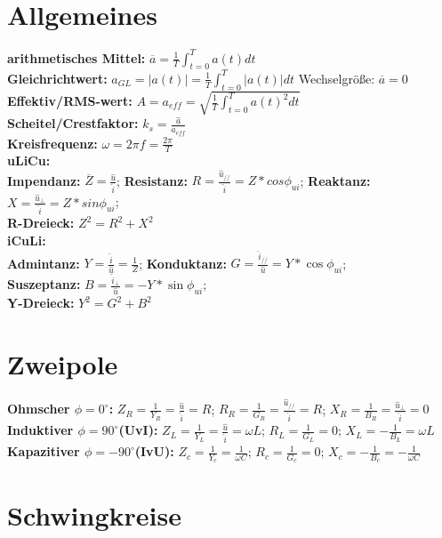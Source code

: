 \documentclass[10pt,a5paper]{article}
\author{Christian Böhm}
\begin{document}
\section{Allgemeines}
\textbf{arithmetisches Mittel:} $\overline{a}=\frac{1}{T}\int_{t=0}^{T}a(t)dt$
\\\textbf{Gleichrichtwert:} $a_{GL}=|a(t)|=\frac{1}{T}\int_{t=0}^{T}|a(t)|dt$ Wechselgröße: $\overline{a}=0$\\
\textbf{Effektiv/RMS-wert:} $A=a_{eff}=\sqrt{\frac{1}{T}\int_{t=0}^{T}a(t)^2dt} $  
\\\textbf{Scheitel/Crestfaktor:} $k_s=\frac{\hat{a}}{a_{eff}}$ 
  \\\textbf{Kreisfrequenz:} $\omega=2\pi f=\frac{2\pi}{T}$
 \\\textbf{uLiCu:}
 \\\textbf{Impendanz:} $\overline{Z}=\frac{\hat{u}}{\hat{i}}$; \textbf{Resistanz:} $R=\frac{\hat{u}_{//}}{\hat{i}}=Z*cos\phi_{ui}$; \textbf{Reaktanz:} $X=\frac{\hat{u}_\bot}{\hat{i}}=Z*sin\phi_{ui}$; \\\textbf{R-Dreieck:} $Z^2=R^2+X^2$ 
 \\ \textbf{iCuLi:}
 \\ \textbf{Admintanz:} $Y=\frac{\hat{i}}{\hat{u}}=\frac{1}{Z}$; \textbf{Konduktanz:} $G=\frac{\hat{i}_{//}}{\hat{u}}=Y*\cos\phi_{ui}$; 
 \\\textbf{Suszeptanz:} $B=\frac{\hat{i}_\bot}{\hat{u}}=-Y*\sin\phi_{ui}$; 
 \\\textbf{Y-Dreieck:} $Y^2=G^2+B^2$ 
 
 \section{Zweipole} 
 \textbf{Ohmscher $\phi=0^\circ$:} $ Z_R=\frac{1}{Y_R}=\frac{\hat{u}}{\hat{i}}=R$; $R_R=\frac{1}{G_R}=\frac{\hat{u}_{//}}{\hat{i}}=R$; $X_R=\frac{1}{B_R}=\frac{\hat{u}_\bot}{\hat{i}}=0$\\ 
 \textbf{Induktiver $\phi=90^\circ$(UvI):} $Z_L=\frac{1}{Y_L}=\frac{\hat{u}}{\hat{i}}=\omega L$; $R_L=\frac{1}{G_L}=0$; $X_L=-\frac{1}{B_L}=\omega L$\\ 
 \textbf{Kapazitiver $\phi=-90^\circ$(IvU):} $Z_c=\frac{1}{Y_c}=\frac{1}{\omega C}$; $R_c=\frac{1}{G_c}=0$; $X_c=-\frac{1}{B_c}=-\frac{1}{\omega C}$
 \section{Schwingkreise}
\end{document}

